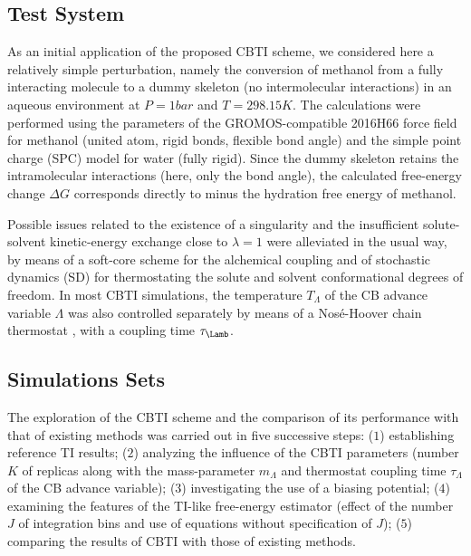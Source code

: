 \subsection{Test System}

As an initial application of the proposed CBTI scheme, we considered here 
a relatively simple perturbation, namely the conversion of methanol
from a fully interacting molecule to a dummy skeleton (no intermolecular interactions) 
in an aqueous environment at $P=1\unit{bar}$ and $T=298.15\unit{K}$.
%
The calculations were performed using 
the parameters of the GROMOS-compatible 2016H66 force field\cite{HO16.1} for methanol\cite{HO11.1} (united atom, rigid bonds, flexible bond angle)
and the simple point charge (SPC) model\cite{BE81.1} for water (fully rigid).
%
Since the dummy skeleton retains the intramolecular interactions (here, only the bond angle),
the calculated free-energy change $\Delta G$ corresponds directly to minus the hydration 
free energy of methanol.


Possible issues related to the existence of a singularity\cite{SI93.1,BE94.1,ZA94.1} 
and the insufficient solute-solvent kinetic-energy exchange\cite{SH03.4,SH05.7,MO07.2,LI08.8} 
close to $\lambda=1$ were alleviated in the usual way,
by means of a soft-core scheme\cite{BE94.1} for the alchemical coupling 
and of stochastic dynamics\cite{LA08.6,VA88.1} (SD) for thermostating the solute and solvent conformational 
degrees of freedom.
%
In most CBTI simulations, the  temperature $T_\Lambda$ of the CB advance variable
$\Lambda$ was also controlled separately by means of a 
Nos\'e-Hoover chain thermostat\cite{MA92.1} 
 ,
with a coupling time $\tau_{\Lamb}$.

\subsection{Simulations Sets}

The exploration of the CBTI scheme and the comparison of its
performance with that of existing methods was carried out in five successive 
steps:
%
($1$) establishing reference TI results;
($2$) analyzing the influence of the CBTI parameters (number $K$ of replicas along with the
       mass-parameter $m_\Lambda$ and thermostat coupling time $\tau_\Lambda$ 
       of the CB advance variable);
($3$) investigating the use of a biasing potential;
($4$) examining the features of the TI-like free-energy estimator (effect of the number $J$ of integration bins and use of equations without specification of $J$);
($5$) comparing the results of CBTI with those of existing methods.


